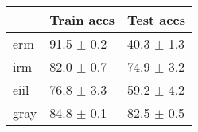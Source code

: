 \begin{tabular}{lll}
\toprule
{} &      Train accs &       Test accs \\
\midrule
erm  &  91.5 $\pm$ 0.2 &  40.3 $\pm$ 1.3 \\
irm  &  82.0 $\pm$ 0.7 &  74.9 $\pm$ 3.2 \\
eiil &  76.8 $\pm$ 3.3 &  59.2 $\pm$ 4.2 \\
gray &  84.8 $\pm$ 0.1 &  82.5 $\pm$ 0.5 \\
\bottomrule
\end{tabular}


